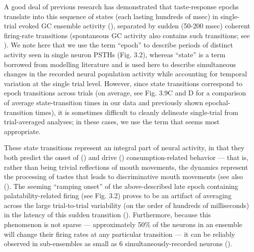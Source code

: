 \begin{refsection}
A good deal of previous research has demonstrated that taste-response epochs translate into this sequence of states (each lasting hundreds of msec) in single-trial evoked GC ensemble activity (\cite{jones2007a,sadacca2016a,mukherjee2019a}), separated by sudden (50-200 msec) coherent firing-rate transitions (spontaneous GC activity also contains such transitions; see \cite{camera2019a,mazzucato2015a}). We note here that we use the term “epoch” to describe periods of distinct activity seen in single neuron PSTHs (Fig. 3.2), whereas “state” is a term borrowed from modelling literature and is used here to describe simultaneous changes in the recorded neural population activity while accounting for temporal variation at the single trial level. However, since state transitions correspond to epoch transitions across trials (on average, see Fig. 3.9C and D for a comparison of average state-transition times in our data and previously shown epochal-transition times), it is sometimes difficult to cleanly delineate single-trial from trial-averaged analyses; in these cases, we use the term that seems most appropriate.

These state transitions represent an integral part of neural activity, in that they both predict the onset of (\cite{sadacca2016a}) and drive (\cite{mukherjee2019a}) consumption-related behavior --- that is, rather than being trivial reflections of mouth movements, the dynamics represent the processing of tastes that leads to discriminative mouth movements (see also (\cite{jones2007a,katz2001a}). The seeming “ramping onset” of the above-described late epoch containing palatability-related firing (see Fig. 3.2) proves to be an artifact of averaging across the large trial-to-trial variability (on the order of hundreds of milliseconds) in the latency of this sudden transition (\cite{jones2007a,sadacca2016a}). Furthermore, because this phenomenon is not sparse --- approximately 50\% of the neurons in an ensemble will change their firing rates at any particular transition --- it can be reliably observed in sub-ensembles as small as 6 simultaneously-recorded neurons (\cite{jones2007a}). 


\end{refsection}
